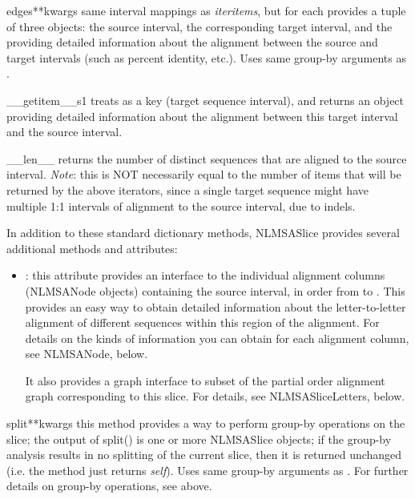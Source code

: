 \documentclass{howto}
\begin{document}
\begin{funcdesc}{edges}{**kwargs}
  same interval mappings as {\em iteritems}, but for
  each provides a tuple of three objects:
  the source interval, the corresponding target interval,
  and the  providing detailed
  information about the alignment between the source and target intervals
  (such as percent identity, etc.).
  Uses same group-by arguments as .
\end{funcdesc}


\begin{funcdesc}{__getitem__}{s1}
  treats  as a key (target sequence
  interval), and returns an  object providing detailed
  information about the alignment between this target interval
  and the source interval.
\end{funcdesc}


\begin{funcdesc}{__len__}{}
  returns the number of distinct sequences that
  are aligned to the source interval.  {\em Note}: this is NOT necessarily 
  equal to the number of items that will be returned by the above iterators,
  since a single target sequence might have multiple 1:1 intervals of
  alignment to the source interval, due to indels.
\end{funcdesc}



In addition to these standard dictionary methods, NLMSASlice provides
several additional methods and attributes:


\begin{itemize}
\item
{}: this attribute provides an interface to 
the individual alignment columns (NLMSANode objects) containing the
source interval, in order from  to .  This provides
an easy way to obtain detailed information about the letter-to-letter
alignment of different sequences within this region of the alignment.
For details on the kinds of information you can obtain for each
alignment column, see NLMSANode, below.

It also provides a graph interface to subset of the partial order alignment 
graph corresponding to this slice.  For details, see NLMSASliceLetters, below.
\end{itemize}

\begin{funcdesc}{split}{**kwargs}
  this method provides a way to perform group-by operations on the slice;
  the output of split() is one or more NLMSASlice objects; if the
  group-by analysis results in no splitting of the current slice, then
  it is returned unchanged (i.e. the method just returns {\em self}).
  Uses same group-by arguments as .
  For further details on group-by operations, see  above.
\end{funcdesc}
\end{document}
